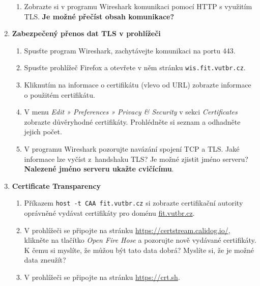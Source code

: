 \documentclass[a4paper,11pt]{article}
\begin{document}
\begin{enumerate}
\begin{enumerate}
      \item Zobrazte si v programu Wireshark komunikaci pomocí HTTP s využitím
        TLS. {\bf Je možné přečíst obsah komunikace?}

    \end{enumerate}

  \item {\bf Zabezpečený přenos dat TLS v prohlížeči}

    \begin{enumerate}

      \item Spusťte program Wireshark, zachytávejte komunikaci na portu 443.

      \item Spusťte prohlížeč Firefox a otevřete v něm stránku
        \verb|wis.fit.vutbr.cz|.

      \item Kliknutím na informace o certifikátu (vlevo od URL) zobrazte
        informace o použitém certifikátu.

      \item V menu \emph{Edit » Preferences » Privacy \& Security} v sekci
        \emph{Certificates} zobrazte důvěryhodné certifikáty. Prohlédněte si
        seznam a odhadněte jejich počet.

      \item V programu Wireshark pozorujte navázání spojení TCP a TLS. Jaké
        informace lze vyčíst z~handshaku TLS? Je možné zjistit jméno serveru?
        {\bf Nalezené jméno serveru ukažte cvičícímu}.

    \end{enumerate}

  \item {\bf Certificate Transparency}

    \begin{enumerate}

      \item Příkazem \verb|host -t CAA fit.vutbr.cz| si zobrazte certifikační
        autority oprávněné vydávat certifikáty pro doménu \url{fit.vutbr.cz}.

      \item V prohlížeči se připojte na stránku
        \url{https://certstream.calidog.io/}, klikněte na tlačítko \emph{Open
        Fire Hose} a pozorujte nově vydávané certifikáty. K čemu si myslíte, že
        můžou být tato data dobrá? Myslíte si, že je možné data zneužít?

      \item V prohlížeči se připojte na stránku \url{https://crt.sh}.


\end{enumerate}
\end{enumerate}
\end{document}
